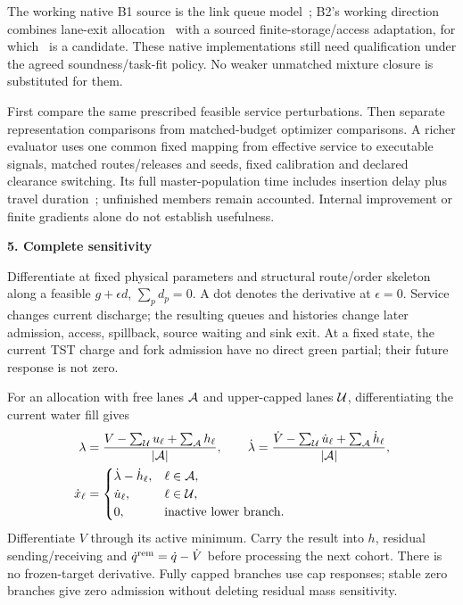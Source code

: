 \documentclass[10pt,a4paper]{article}
\newcommand{\head}[1]{\par\vspace{4pt}\noindent\textbf{#1}\par\nobreak\vspace{1pt}}
\begin{document}
The working native B1 source is the link queue model~\cite{wei};
B2's working direction combines lane-exit allocation~\cite{gong}
with a sourced finite-storage/access adaptation, for which~\cite{liu}
is a candidate. These native implementations still need qualification
under the agreed soundness/task-fit policy. No weaker unmatched mixture
closure is substituted for them.

First compare the same prescribed feasible service perturbations.
Then separate representation comparisons from matched-budget optimizer
comparisons. A richer evaluator uses one common fixed mapping from
effective service to executable signals, matched routes/releases and
seeds, fixed calibration and declared clearance switching.
Its full master-population time includes insertion delay plus travel
duration~\cite{sumo}; unfinished members remain accounted.
Internal improvement or finite gradients alone do not establish usefulness.

\newpage
\head{5. Complete sensitivity}
Differentiate at fixed physical parameters and structural route/order
skeleton along a feasible $g+\epsilon d$, $\sum_p d_p=0$.
A dot denotes the derivative at $\epsilon=0$.
Service changes current discharge; the resulting queues and histories
change later admission, access, spillback, source waiting and sink exit.
At a fixed state, the current TST charge and fork admission have no
direct green partial; their future response is not zero.

For an allocation with free lanes ${\cal A}$ and upper-capped lanes
${\cal U}$, differentiating the current water fill gives
\begin{align}
 \lambda&=\frac{V-\sum_{\cal U}u_\ell+\sum_{\cal A}h_\ell}
                  {|{\cal A}|},\qquad
 \dot\lambda=\frac{\dot V-\sum_{\cal U}\dot u_\ell+
                                  \sum_{\cal A}\dot h_\ell}
                  {|{\cal A}|},\nonumber\\
 \dot x_\ell&=
 \begin{cases}
 \dot\lambda-\dot h_\ell,&\ell\in{\cal A},\\
 \dot u_\ell,&\ell\in{\cal U},\\
 0,&\text{inactive lower branch}.
 \end{cases}
 \label{eq:compact-allocation-derivative}
\end{align}
Differentiate $V$ through its active minimum. Carry the result into
$h$, residual sending/receiving and $\dot q^{\rm rem}=\dot q-\dot V$
before processing the next cohort. There is no frozen-target derivative.
Fully capped branches use cap responses; stable zero branches give zero
admission without deleting residual mass sensitivity.
\end{document}
